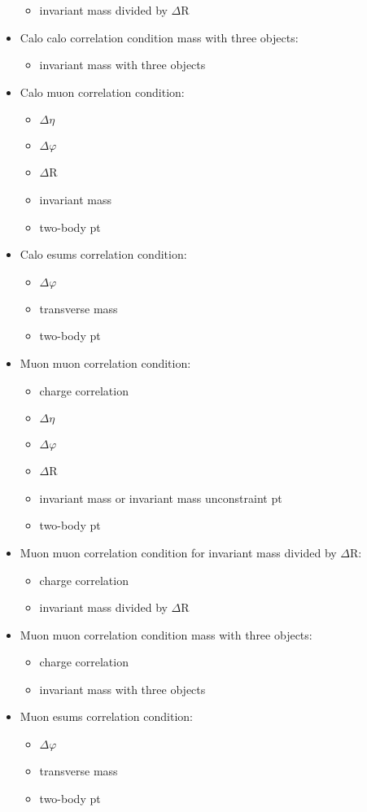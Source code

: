 \begin{itemize}
\begin{itemize}
\item invariant mass divided by $\Delta$R
\end{itemize}
\item Calo calo correlation condition mass with three objects:
\begin{itemize}
\item invariant mass with three objects
\end{itemize}
\item Calo muon correlation condition:
\begin{itemize}
\item $\Delta\eta$
\item $\Delta\varphi$
\item $\Delta$R
\item invariant mass
\item two-body pt
\end{itemize}
\item Calo esums correlation condition:
\begin{itemize}
\item $\Delta\varphi$
\item transverse mass
\item two-body pt
\end{itemize}
\item Muon muon correlation condition:
\begin{itemize}
\item charge correlation
\item $\Delta\eta$
\item $\Delta\varphi$
\item $\Delta$R
\item invariant mass or invariant mass unconstraint pt
\item two-body pt
\end{itemize}
\item Muon muon correlation condition for invariant mass divided by $\Delta$R:
\begin{itemize}
\item charge correlation
\item invariant mass divided by $\Delta$R
\end{itemize}
\item Muon muon correlation condition mass with three objects:
\begin{itemize}
\item charge correlation
\item invariant mass with three objects
\end{itemize}
\item Muon esums correlation condition:
\begin{itemize}
\item $\Delta\varphi$
\item transverse mass
\item two-body pt
\end{itemize}
\end{itemize}


